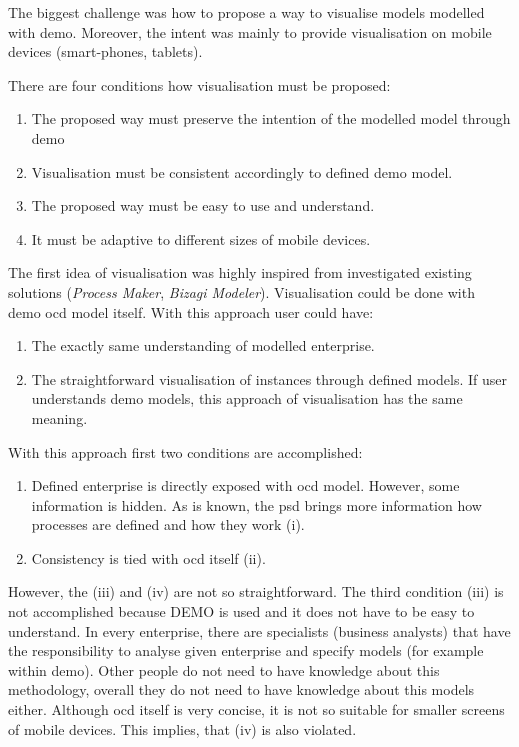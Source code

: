 The biggest challenge was how to propose a way to visualise models modelled with \gls{demo}. Moreover, the intent was mainly to provide visualisation on mobile devices (smart-phones, tablets).

There are four conditions how visualisation must be proposed:
\begin{enumerate}[i]
    \item The proposed way must preserve the intention of the modelled model through \gls{demo}
    \item Visualisation must be consistent accordingly to defined \gls{demo} model.
    \item The proposed way must be easy to use and understand.  
    \item It must be adaptive to different sizes of mobile devices. 
\end{enumerate}

The first idea of visualisation was highly inspired from investigated existing solutions (\textit{Process Maker}, \textit{Bizagi Modeler}). Visualisation could be done with \gls{demo} \gls{ocd} model itself. With this approach user could have:
\begin{enumerate}
  \item The exactly same understanding of modelled enterprise.
  \item The straightforward visualisation of instances through defined models. If user understands \gls{demo} models, this approach of visualisation has the same meaning.
\end{enumerate}

With this approach first two conditions are accomplished:
\begin{enumerate}
\item Defined enterprise is directly exposed with \gls{ocd} model. However, some information is hidden. As is known, the \gls{psd} brings more information how processes are defined and how they work (i). 
\item Consistency is tied with \gls{ocd} itself (ii).
\end{enumerate}

However, the (iii) and (iv) are not so straightforward. The third condition (iii) is not accomplished because DEMO is used and it does not have to be easy to understand. In every enterprise, there are specialists (business analysts) that have the responsibility to analyse given enterprise and specify models (for example within \gls{demo}). Other people do not need to have knowledge about this methodology, overall they do not need to have knowledge about this models either. Although \gls{ocd} itself is very concise, it is not so suitable for smaller screens of mobile devices. This implies, that (iv) is also violated.
